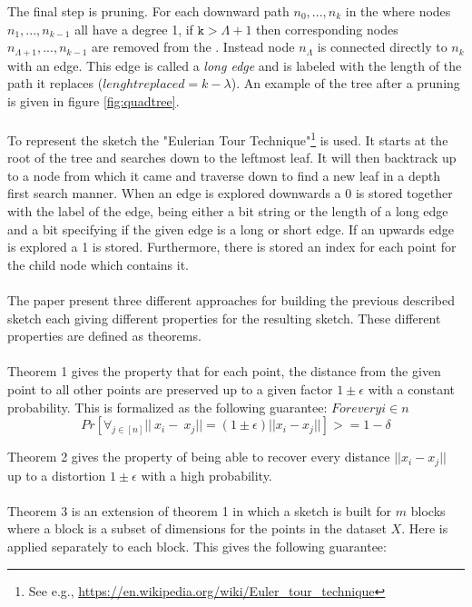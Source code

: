 The final step is pruning. For each downward path $n_0,...,n_k$ in the \qt{} where nodes $n_1,...,n_{k-1}$ all have a degree 1, if \ensuremath{\texttt{k} > \Lambda+1} then corresponding nodes $n_{\Lambda+1},...,n_{k-1}$ are removed from the \qt{}. Instead node $n_{\Lambda}$ is connected directly to $n_{k}$ with an edge. This edge is called a \textit{long edge} and is labeled with the length of the path it replaces ($lenght replaced = k-\lambda$). An example of the tree after a pruning is given in figure \ref{fig:quadtree}.
\\
\\
To represent the sketch the "Eulerian Tour Technique"\footnote{See e.g., \url{https://en.wikipedia.org/wiki/Euler\_tour\_technique}} is used.
It starts at the root of the tree and searches down to the leftmost leaf. It will then backtrack up to a node from which it came and traverse down to find a new leaf in a depth first search manner. When an edge is explored downwards a 0 is stored together with the label of the edge, being either a bit string or the length of a long edge and a bit specifying if the given edge is a long or short edge. If an upwards edge is explored a 1 is stored. Furthermore, there is stored an index for each point for the child node which contains it.
\\
\\
The paper \cite{wagner17} present three different approaches for building the previous described sketch each giving different properties for the resulting sketch. These different properties are defined as theorems.
\\
\\
Theorem 1 gives the property that for each point, the distance from the given point to all other points are preserved up to a given factor $1\pm\epsilon$ with a constant probability. This is formalized as the following guarantee: $For every i\in{}n$
\begin{equation}
Pr[\forall{}_{j\in{}[n]} ||~x_i-~x_j||= (1\pm\epsilon)||x_i-x_j||] >= 1 - \delta
\end{equation}

Theorem 2 gives the property of being able to recover every distance $||x_i-x_j||$  up to a distortion $1\pm\epsilon$ with a high probability.
\\
\\
Theorem 3 is an extension of theorem 1 in which a sketch is built for $m$ blocks where a block is a subset of dimensions for the points in the dataset $X$. Here \qs{} is applied separately to each block. This gives the following guarantee:


